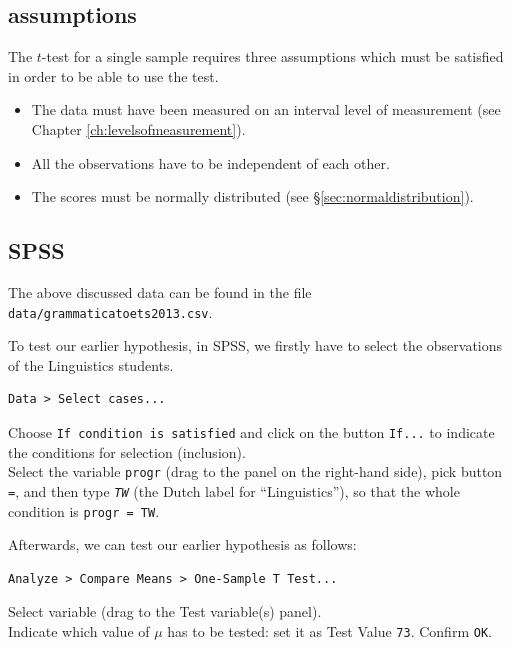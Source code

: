 \documentclass[
]{book}
\begin{document}
\hypertarget{sec:ttest-assumptions}{%
\subsection{assumptions}\label{sec:ttest-assumptions}}

The \(t\)-test for a single sample requires three assumptions which
must be satisfied in order to be able to use the test.

\begin{itemize}
\item
  The data must have been measured on an interval level of measurement (see
  Chapter \ref{ch:levelsofmeasurement}).
\item
  All the observations have to be independent of each other.
\item
  The scores must be normally distributed (see
  §\ref{sec:normaldistribution}).
\end{itemize}

\hypertarget{spss-10}{%
\subsection{SPSS}\label{spss-10}}

The above discussed data can be found in the file \texttt{data/grammaticatoets2013.csv}.

To test our earlier hypothesis, in SPSS, we firstly have
to select the observations of the Linguistics students.

\begin{verbatim}
Data > Select cases...
\end{verbatim}

Choose \texttt{If\ condition\ is\ satisfied} and click on the button \texttt{If...} to indicate
the conditions for selection (inclusion).~\\
Select the variable \texttt{progr} (drag to the panel on the right-hand side), pick
button \texttt{=}, and then type \emph{\texttt{TW}} (the Dutch label for ``Linguistics''), so that the whole condition is
\texttt{progr\ =\ TW}.

Afterwards, we can test our earlier hypothesis as follows:

\begin{verbatim}
Analyze > Compare Means > One-Sample T Test...
\end{verbatim}

Select variable (drag to the Test variable(s) panel).\\
Indicate which value of \(\mu\) has to be tested: set it as
Test Value \texttt{73}. Confirm \texttt{OK}.
\end{document}
